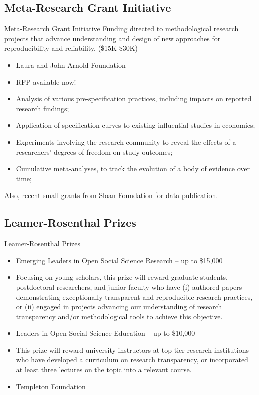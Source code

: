 \documentclass{beamer}
\begin{document}
\subsection{Meta-Research Grant Initiative}
\begin{frame}{Meta-Research Grant Initiative}
Funding directed to methodological research projects that advance understanding and design of new approaches for reproducibility and reliability. (\$15K-\$30K)
\begin{itemize}
\item Laura and John Arnold Foundation
\item RFP available now! \href{http://www.bitss.org/ssmart/}{}
\item Analysis of various pre-specification practices, including impacts on reported research findings;
\item Application of specification curves to existing influential studies in economics;
\item Experiments involving the research community to reveal the effects of a researchers’ degrees of freedom on study outcomes;
\item Cumulative meta-analyses, to track the evolution of a body of evidence over time;
\end{itemize}

Also, recent small grants from Sloan Foundation for data publication.

\end{frame}

\subsection{Leamer-Rosenthal Prizes}
\begin{frame}{Leamer-Rosenthal Prizes}

\begin{itemize}
\item Emerging Leaders in Open Social Science Research – up to \$15,000
\href{http://www.bitss.org/prizes}{}

\item 
Focusing on young scholars, this prize will reward graduate students, postdoctoral researchers, and junior faculty who have (i) authored papers demonstrating exceptionally transparent and reproducible research practices, or (ii) engaged in projects advancing our understanding of research transparency and/or methodological tools to achieve this objective.

\item Leaders in Open Social Science Education – up to \$10,000

\item This prize will reward university instructors at top-tier research institutions who have developed a curriculum on research transparency, or incorporated at least three lectures on the topic into a relevant course. 

\item Templeton Foundation
\end{itemize}
\end{frame}
\end{document}
